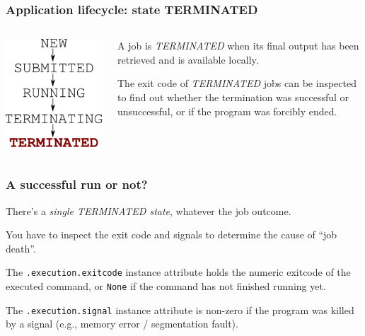 \documentclass[english,serif,mathserif,xcolor=pdftex,dvipsnames,table]{beamer}
\begin{document}
\begin{frame}[fragile]
\frametitle{Application lifecycle: state TERMINATED}
\begin{columns}[c]
  \begin{column}{0.5\textwidth}
    \includegraphics[height=0.7\textheight]{fig/state-TERMINATED}
  \end{column}
  \begin{column}{0.4\textwidth}
    \raggedleft

    A job is \emph{TERMINATED} when its final output has been
    retrieved and is available locally.

    \+ 
    The exit code of \emph{TERMINATED} jobs can be inspected to
    find out whether the termination was successful or unsuccessful,
    or if the program was forcibly ended.

  \end{column}
\end{columns}
\end{frame}


\begin{frame}[fragile]
\frametitle{A successful run or not?}

  There's a \emph{single TERMINATED state}, whatever the job outcome.

  \+ 
  You have to inspect the exit code and signals to determine the
  cause of ``job death''.

  \+ 
  The \texttt{.execution.exitcode} instance attribute holds the
  numeric exitcode of the executed command, or \texttt{None} if the
  command has not finished running yet.
  
  \+ 
  The \texttt{.execution.signal} instance attribute is non-zero if
  the program was killed by a signal (e.g., memory error / segmentation fault).
\end{frame}
\end{document}
